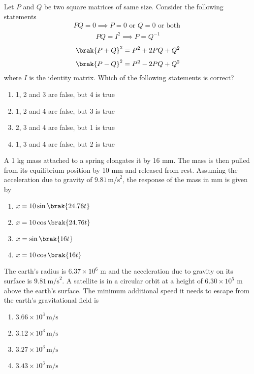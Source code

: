 \item  Let $P$ and $Q$ be two square matrices of same size. Consider the following statements
\begin{align}
    PQ=0  \implies  P=0 \text{ or } Q=0 \text{ or both }
\end{align}
\begin{align}
    PQ=I^2 \implies  P=Q^{-1}
\end{align}
\begin{align}
    {\brak{P+Q}}^2 =P^2+2PQ+Q^2
\end{align}
\begin{align}
     {\brak{P-Q}}^2 =P^2-2PQ+Q^2
\end{align}
where $I$ is the identity matrix. Which of the following statements is correct?
\begin{multicols}{2}
\begin{enumerate}
\item 1, 2 and 3 are false, but 4 is true
\item 1, 2 and 4 are false, but 3 is true
\item 2, 3 and 4 are false, but 1 is true 
\item 1, 3 and 4 are false, but 2 is true
\end{enumerate}
\end{multicols}

\item   A 1 kg mass attached to a spring elongates it by 16 mm. The mass is then pulled from its equilibrium position by 10 mm and released from rest. Assuming the acceleration due to gravity of $9.81 \, \text{m/s}^2$, the response of the mass in mm is given by
\begin{multicols}{2}
\begin{enumerate}
\item $x=10 \sin\brak{24.76t}$
\item $x=10 \cos\brak{24.76t}$
\item $x=\sin\brak{16t}$
\item $x=10\cos\brak{16t}$
\end{enumerate}
\end{multicols}

\item  The earth's radius is $6.37 \times 10^6$ m and the acceleration due to gravity on its surface is $9.81 \, \text{m/s}^2$. A satellite is in a circular orbit at a height of $6.30 \times 10^5$ m above the earth's surface. The minimum additional speed it needs to escape from the earth's gravitational field is
\begin{multicols}{2}
\begin{enumerate}
\item $3.66 \times 10^3 \, \text{m/s}$
\item $3.12 \times 10^3 \, \text{m/s}$
\item $3.27 \times 10^3 \, \text{m/s}$
\item $3.43 \times 10^3 \, \text{m/s}$
\end{enumerate}
\end{multicols}

